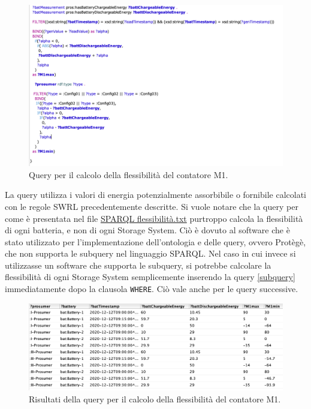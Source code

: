 \begin{figure}[H]
    \centering
    \includegraphics[width=15cm]{images/query_flessibilita.png}
    \caption{Query per il calcolo della flessibilità del contatore M1.}
    \label{fig:query_flessibilita}
\end{figure}

La query utilizza i valori di energia potenzialmente assorbibile o fornibile calcolati con le regole SWRL precedentemente descritte.
Si vuole notare che la query per come è presentata nel file \href{https://github.com/19eddie/SemanticWeb-Assignment02-03/blob/main/SPARQL%20flessibilit%C3%A0.txt}{SPARQL flessibilità.txt} 
purtroppo calcola la flessibilità di ogni batteria, e non di ogni Storage System.
Ciò è dovuto al software che è stato utilizzato per l'implementazione dell'ontologia e delle query, ovvero Protègè,
che non supporta le subquery nel linguaggio SPARQL.
Nel caso in cui invece si utilizzasse un software che supporta le subquery, si potrebbe calcolare la flessibilità di ogni Storage System semplicemente inserendo la query \ref*{subquery} immediatamente dopo la clausola \texttt{WHERE}.
Ciò vale anche per le query successive.

\begin{figure}[H]
    \centering
    \includegraphics[width=15cm]{images/query_flessibilita_res.png}
    \caption{Risultati della query per il calcolo della flessibilità del contatore M1.}
    \label{fig:query_flessibilita_res}
\end{figure}

